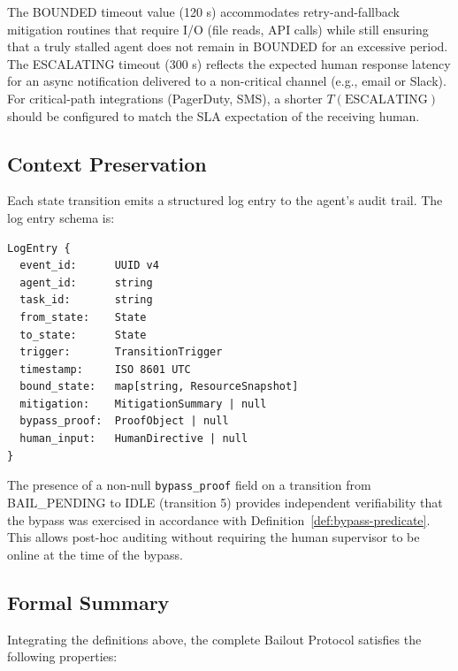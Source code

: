 \bigskip
The BOUNDED timeout value (120 s) accommodates retry-and-fallback
mitigation routines that require I/O (file reads, API calls) while still
ensuring that a truly stalled agent does not remain in BOUNDED for an
excessive period.  The ESCALATING timeout (300 s) reflects the expected
human response latency for an async notification delivered to a
non-critical channel (e.g., email or Slack).  For critical-path integrations
(PagerDuty, SMS), a shorter $T(\text{ESCALATING})$ should be configured
to match the SLA expectation of the receiving human.


\subsection{Context Preservation}

Each state transition emits a structured log entry to the agent's
audit trail.  The log entry schema is:

\begin{verbatim}
LogEntry {
  event_id:      UUID v4
  agent_id:      string
  task_id:       string
  from_state:    State
  to_state:      State
  trigger:       TransitionTrigger
  timestamp:     ISO 8601 UTC
  bound_state:   map[string, ResourceSnapshot]
  mitigation:    MitigationSummary | null
  bypass_proof:  ProofObject | null
  human_input:   HumanDirective | null
}
\end{verbatim}

\bigskip
The presence of a non-null \texttt{bypass\_proof} field on a transition
from BAIL\_PENDING to IDLE (transition 5) provides independent
verifiability that the bypass was exercised in accordance with
Definition~\ref{def:bypass-predicate}.  This allows post-hoc auditing
without requiring the human supervisor to be online at the time of the
bypass.


\subsection{Formal Summary}

Integrating the definitions above, the complete Bailout Protocol satisfies
the following properties:

